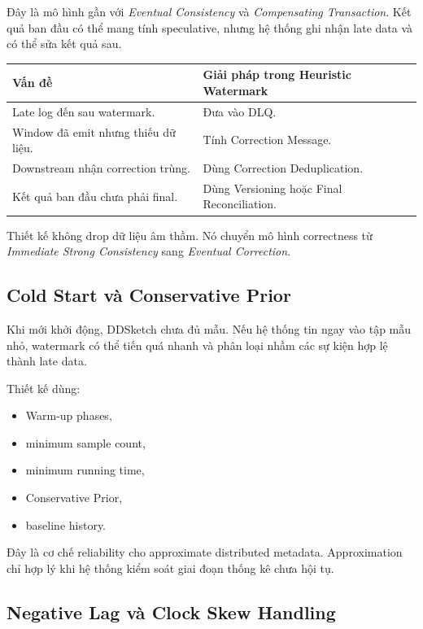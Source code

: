 \documentclass[12pt,a4paper]{article}
\begin{document}
Đây là mô hình gần với \textit{Eventual Consistency} và \textit{Compensating Transaction}. Kết quả ban đầu có thể mang tính speculative, nhưng hệ thống ghi nhận late data và có thể sửa kết quả sau.

\begin{longtable}{p{} p{}}
\toprule
\textbf{Vấn đề} & \textbf{Giải pháp trong Heuristic Watermark} \\
\midrule
\endhead
Late log đến sau watermark. & Đưa vào DLQ. \\
Window đã emit nhưng thiếu dữ liệu. & Tính Correction Message. \\
Downstream nhận correction trùng. & Dùng Correction Deduplication. \\
Kết quả ban đầu chưa phải final. & Dùng Versioning hoặc Final Reconciliation. \\
\bottomrule
\end{longtable}

Thiết kế không drop dữ liệu âm thầm. Nó chuyển mô hình correctness từ \textit{Immediate Strong Consistency} sang \textit{Eventual Correction}.

\subsection{Cold Start và Conservative Prior}

Khi mới khởi động, DDSketch chưa đủ mẫu. Nếu hệ thống tin ngay vào tập mẫu nhỏ, watermark có thể tiến quá nhanh và phân loại nhầm các sự kiện hợp lệ thành late data.

Thiết kế dùng:

\begin{itemize}
    \item Warm-up phases,
    \item minimum sample count,
    \item minimum running time,
    \item Conservative Prior,
    \item baseline history.
\end{itemize}

Đây là cơ chế reliability cho approximate distributed metadata. Approximation chỉ hợp lý khi hệ thống kiểm soát giai đoạn thống kê chưa hội tụ.

\subsection{Negative Lag và Clock Skew Handling}
\end{document}
